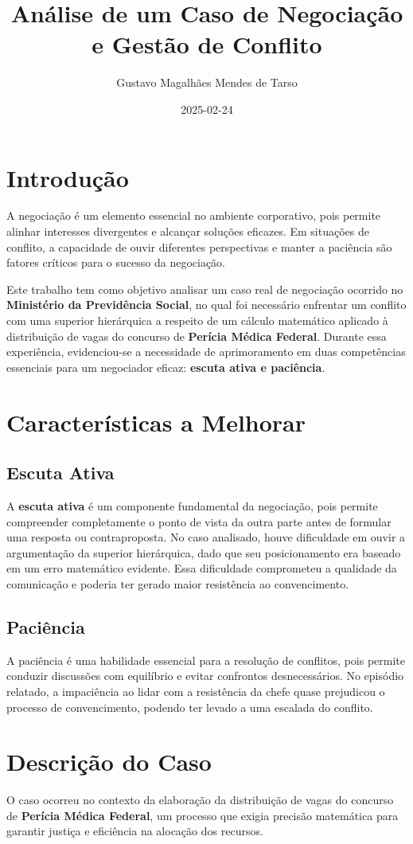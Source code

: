 \documentclass[11pt]{article}
\author{Gustavo Magalhães Mendes de Tarso}
\date{2025-02-24}
\title{Análise de um Caso de Negociação e Gestão de Conflito}
\begin{document}
\maketitle
\section*{Introdução}
\label{sec:org622d705}
A negociação é um elemento essencial no ambiente corporativo, pois permite alinhar interesses divergentes e alcançar soluções eficazes. Em situações de conflito, a capacidade de ouvir diferentes perspectivas e manter a paciência são fatores críticos para o sucesso da negociação.

Este trabalho tem como objetivo analisar um caso real de negociação ocorrido no \textbf{Ministério da Previdência Social}, no qual foi necessário enfrentar um conflito com uma superior hierárquica a respeito de um cálculo matemático aplicado à distribuição de vagas do concurso de \textbf{Perícia Médica Federal}. Durante essa experiência, evidenciou-se a necessidade de aprimoramento em duas competências essenciais para um negociador eficaz: \textbf{escuta ativa e paciência}.
\section*{Características a Melhorar}
\label{sec:org16cb0f7}
\subsection*{Escuta Ativa}
\label{sec:orgc10f94d}
A \textbf{escuta ativa} é um componente fundamental da negociação, pois permite compreender completamente o ponto de vista da outra parte antes de formular uma resposta ou contraproposta. No caso analisado, houve dificuldade em ouvir a argumentação da superior hierárquica, dado que seu posicionamento era baseado em um erro matemático evidente. Essa dificuldade comprometeu a qualidade da comunicação e poderia ter gerado maior resistência ao convencimento.
\subsection*{Paciência}
\label{sec:org982d93b}
A paciência é uma habilidade essencial para a resolução de conflitos, pois permite conduzir discussões com equilíbrio e evitar confrontos desnecessários. No episódio relatado, a impaciência ao lidar com a resistência da chefe quase prejudicou o processo de convencimento, podendo ter levado a uma escalada do conflito.
\section*{Descrição do Caso}
\label{sec:orgc0798a6}
O caso ocorreu no contexto da elaboração da distribuição de vagas do concurso de \textbf{Perícia Médica Federal}, um processo que exigia precisão matemática para garantir justiça e eficiência na alocação dos recursos.
\end{document}
